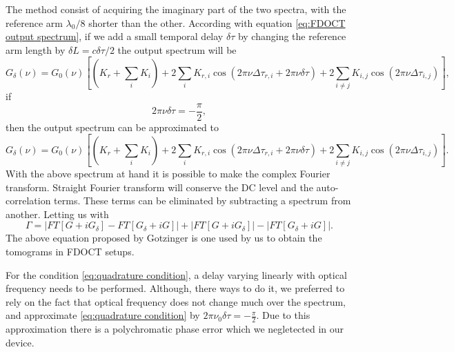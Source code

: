 \documentclass[12pt,twoside,english]{book}
\renewcommand{\~}{\perispomeni}%
\numberwithin{equation}{section}
\numberwithin{figure}{section}
\begin{document}
The method consist of acquiring the imaginary part of the two spectra, with the reference arm $\lambda_0/8$ shorter than the other. According with equation \ref{eq:FDOCT output spectrum}, if we add a small temporal delay $\delta\tau$ by changing the reference arm length by $\delta L=c\delta\tau/2$ the output spectrum will be
\begin{equation}
G_\delta\left(\nu\right)=G_{0}\left(\nu\right)\left[\left(K_{r}+\sum_{i}K_{i}\right)+2\sum_{i}K_{r,i}\cos\left(2\pi\nu\Delta\tau_{r,i}+2\pi\nu\delta\tau\right)+2\sum_{i\ne j}K_{i,j}\cos\left(2\pi\nu\Delta\tau_{i,j}\right)\right],
\label{eq:FDOCT output spectrum delay}
\end{equation}
if 
\begin{equation}
2\pi\nu\delta\tau=-\frac{\pi}{2},
\label{eq:quadrature condition}
\end{equation} 
then the output spectrum can be approximated to
\begin{equation}
G_\delta\left(\nu\right)=G_{0}\left(\nu\right)\left[\left(K_{r}+\sum_{i}K_{i}\right)+2\sum_{i}K_{r,i}\cos\left(2\pi\nu\Delta\tau_{r,i}+2\pi\nu\delta\tau\right)+2\sum_{i\ne j}K_{i,j}\cos\left(2\pi\nu\Delta\tau_{i,j}\right)\right].
\label{eq:FDOCT output spectrum sin}
\end{equation}
With the above spectrum at hand it is possible to make the complex Fourier transform. Straight Fourier transform will conserve the DC level and the auto-correlation terms. These terms can be eliminated by subtracting a spectrum from another. Letting us with
\begin{equation}
\Gamma=\left|FT\left[G+iG_{\delta}\right]-FT\left[G_{\delta}+iG\right]\right|+\left|FT\left[G+iG_{\delta}\right]\right|-\left|FT\left[G_{\delta}+iG\right]\right|.
\label{eq:quadrature equation}
\end{equation}
The above equation proposed by Gotzinger\cite{Gotzinger:2005p1712} is one used by us to obtain the tomograms in FDOCT setups.

For the condition \ref{eq:quadrature condition}, a delay varying linearly with optical frequency needs to be performed. Although, there ways to do it, we preferred to rely on the fact that optical frequency does not change much over the spectrum, and approximate \ref{eq:quadrature condition} by $2\pi\nu_0\delta\tau=-\frac{\pi}{2}$. Due to this approximation there is a polychromatic phase error\cite{Leitgeb:2003p1779} which we negletected in our device.
\end{document}
